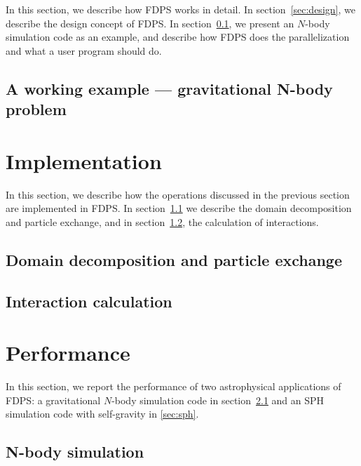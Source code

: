 \documentclass{acm_proc_article-sp}
\begin{document}
In this section, we describe how FDPS works in detail.  In
section~\ref{sec:design}, we describe the design concept of FDPS. In
section~\ref{sec:samplecode}, we present an $N$-body simulation code
as an example, and describe how FDPS does the parallelization and what
a user program should do.



\subsection{A working example --- gravitational {\secit N}-body problem}
\label{sec:samplecode}



\section{Implementation}
\label{sec:implementation}

In this section, we describe how the operations discussed in the
previous section are implemented in FDPS. In
section~\ref{sec:decomposition} we describe the domain decomposition
and particle exchange, and in section~\ref{sec:calculation}, the
calculation of interactions.

\subsection{Domain decomposition and particle exchange}
\label{sec:decomposition}



\subsection{Interaction calculation}
\label{sec:calculation}



\section{Performance}
\label{sec:performance}

In this section, we report the performance of two astrophysical
applications of FDPS: a gravitational $N$-body simulation code in
section~\ref{sec:nbody} and an SPH simulation code with self-gravity
in \ref{sec:sph}.

\subsection{{\secit N}-body simulation}
\label{sec:nbody}
\end{document}
